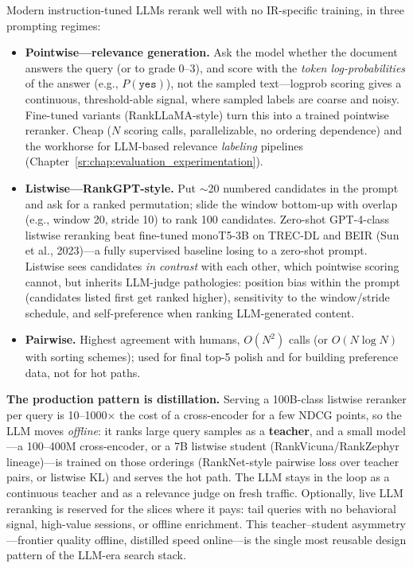 Modern instruction-tuned LLMs rerank well with no IR-specific training, in three prompting regimes:

\begin{itemize}
    \item \textbf{Pointwise---relevance generation.} Ask the model whether the document answers the query (or to grade 0--3), and score with the \textit{token log-probabilities} of the answer (e.g., $P(\texttt{yes})$), not the sampled text---logprob scoring gives a continuous, threshold-able signal, where sampled labels are coarse and noisy. Fine-tuned variants (RankLLaMA-style) turn this into a trained pointwise reranker. Cheap ($N$ scoring calls, parallelizable, no ordering dependence) and the workhorse for LLM-based relevance \textit{labeling} pipelines (Chapter~\ref{sr:chap:evaluation_experimentation}).
    \item \textbf{Listwise---RankGPT-style.} Put $\sim$20 numbered candidates in the prompt and ask for a ranked permutation; slide the window bottom-up with overlap (e.g., window 20, stride 10) to rank 100 candidates. Zero-shot GPT-4-class listwise reranking beat fine-tuned monoT5-3B on TREC-DL and BEIR (Sun et al., 2023)---a fully supervised baseline losing to a zero-shot prompt. Listwise sees candidates \textit{in contrast} with each other, which pointwise scoring cannot, but inherits LLM-judge pathologies: position bias within the prompt (candidates listed first get ranked higher), sensitivity to the window/stride schedule, and self-preference when ranking LLM-generated content.
    \item \textbf{Pairwise.} Highest agreement with humans, $O(N^2)$ calls (or $O(N \log N)$ with sorting schemes); used for final top-5 polish and for building preference data, not for hot paths.
\end{itemize}

\textbf{The production pattern is distillation.} Serving a 100B-class listwise reranker per query is 10--1000$\times$ the cost of a cross-encoder for a few NDCG points, so the LLM moves \textit{offline}: it ranks large query samples as a \textbf{teacher}, and a small model---a 100--400M cross-encoder, or a 7B listwise student (RankVicuna/RankZephyr lineage)---is trained on those orderings (RankNet-style pairwise loss over teacher pairs, or listwise KL) and serves the hot path. The LLM stays in the loop as a continuous teacher and as a relevance judge on fresh traffic. Optionally, live LLM reranking is reserved for the slices where it pays: tail queries with no behavioral signal, high-value sessions, or offline enrichment. This teacher--student asymmetry---frontier quality offline, distilled speed online---is the single most reusable design pattern of the LLM-era search stack.

